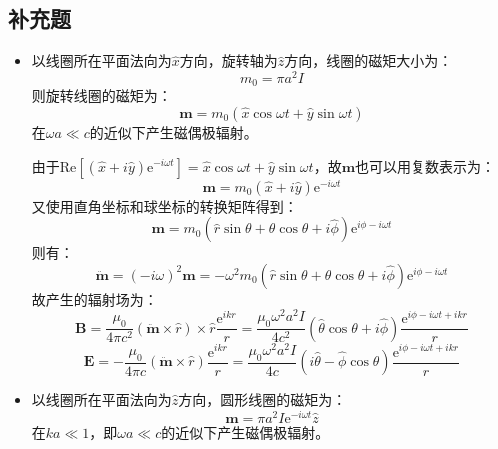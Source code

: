 \documentclass[a4paper,fontset=none]{ctexart}
\begin{document}
    \subsection*{补充题}

    \begin{itemize}

        \item[1.]
        以线圈所在平面法向为$\hat{x}$方向，旋转轴为$\hat{z}$方向，线圈的磁矩大小为：
        \[
            m_0 = \pi a^2I
        \]
        则旋转线圈的磁矩为：
        \[
            \bm{m} = m_0(\hat{x}\cos\omega t + \hat{y}\sin\omega t)
        \]
        在$\omega a\ll c$的近似下产生磁偶极辐射。

        由于$\mathrm{Re}\left[(\hat{x} + i\hat{y})\mathrm{e}^{-i\omega t}\right]=\hat{x}\cos\omega t + \hat{y}\sin\omega t$，故$\bm{m}$也可以用复数表示为：
        \[
            \bm{m} = m_0(\hat{x} + i\hat{y})\mathrm{e}^{-i\omega t}
        \]
        又使用直角坐标和球坐标的转换矩阵得到：
        \[
            \bm{m} = m_0(\hat{r}\sin\theta + \theta\cos\theta + i\hat{\phi})\mathrm{e}^{i\phi-i\omega t}
        \]
        则有：
        \[
            \ddot{\bm{m}} = (-i\omega)^2\bm{m} = -\omega^2m_0(\hat{r}\sin\theta + \theta\cos\theta + i\hat{\phi})\mathrm{e}^{i\phi-i\omega t}
        \]
        故产生的辐射场为：
        \[
            \bm{B} = \frac{\mu_0}{4\pi c^2}(\ddot{\bm{m}} \times \hat{r}) \times \hat{r} \frac{\mathrm{e}^{ikr}}{r} = \frac{\mu_0\omega^2a^2I}{4c^2}(\hat{\theta}\cos\theta + i\hat{\phi})\frac{\mathrm{e}^{i\phi-i\omega t+ikr}}{r}
        \]
        \[
            \bm{E} = -\frac{\mu_0}{4\pi c}(\ddot{\bm{m}} \times \hat{r}) \frac{\mathrm{e}^{ikr}}{r} = \frac{\mu_0\omega^2a^2I}{4c}(i\hat{\theta} - \hat{\phi}\cos\theta)\frac{\mathrm{e}^{i\phi-i\omega t+ikr}}{r}
        \]

        \item[2.]
        以线圈所在平面法向为$\hat{z}$方向，圆形线圈的磁矩为：
        \[
            \bm{m} = \pi a^2I\mathrm{e}^{-i\omega t}\hat{z}
        \]
        在$ka\ll1$，即$\omega a\ll c$的近似下产生磁偶极辐射。


\end{itemize}
\end{document}

